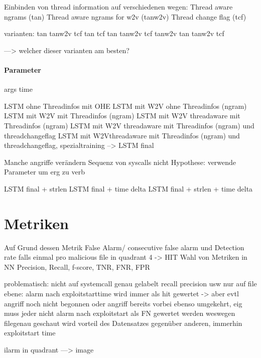             Einbinden von thread information auf verschiedenen wegen:
            Thread aware ngrams (tan)
            Thread aware ngrams for w2v (tanw2v)
            Thread change flag (tcf)

            varianten:
            tan
            tanw2v
            tcf
            tan tcf
            tan tanw2v
            tcf tanw2v
            tan tanw2v tcf

            ---> welcher dieser varianten am besten?

        \paragraph{Parameter}
            args
            time

            \ac{LSTM} ohne Threadinfos mit OHE
            LSTM mit W2V ohne Threadinfos (ngram)
            LSTM mit W2V mit Threadinfos (ngram)
            LSTM mit W2V threadaware mit Threadinfos (ngram)
            LSTM mit W2V threadaware mit Threadinfos (ngram) und threadchangeflag
            LSTM mit W2Vthreadaware mit Threadinfos (ngram) und threadchangeflag, spezialtraining
            --> LSTM final

            Manche angriffe verändern Sequenz von syscalls nicht
            Hypothese:
            verwende Parameter um erg zu verb

            LSTM final + strlen
            LSTM final + time delta
            LSTM final + strlen + time delta



\section{Metriken}\label{sec:Metriken}

    Auf Grund dessen Metrik False Alarm/ consecutive false alarm und Detection rate falls einmal pro malicious file in quadrant 4 -> HIT
    Wahl von Metriken in NN
    Precision, Recall, f-score, TNR, FNR, FPR

    problematisch:
    nicht auf systemcall genau gelabelt
    recall precision usw nur auf file ebene:
    alarm nach exploitstarttime wird immer als hit gewertet -> aber evtl angriff noch nicht begonnen
    oder angriff bereits vorbei
    ebenso umgekehrt, eig muss jeder nicht alarm nach exploitstart als FN gewertet werden
    weswegen filegenau geschaut wird
    vorteil des Datensatzes gegenüber anderen, immerhin exploitstart time

    ilarm in quadrant ---> image
